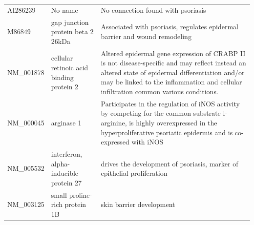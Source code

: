 \documentclass[10pt,a4paper]{report}
\begin{document}
\begin{table}[]
\begin{tabular}{l|p{4.5cm} p{8.5cm}}
			AI286239           &  No name                                                                                                                       &   No connection found with psoriasis                                                                                                                                                                                                                                        \\
			M86849             & gap junction protein beta 2 26kDa                                                                                       & Associated with psoriasis, regulates epidermal barrier and wound remodeling\cite{sun2010association, djalilian2006connexin}                                                                                                                                                               \\
			NM\_001878         & cellular retinoic acid binding protein 2                                                                                & Altered epidermal gene expression of CRABP II is not disease-specific and may reflect instead an altered state of epidermal differentiation and/or may be linked to the inflammation and cellular infiltration common various conditions.\cite{algermissen1996differential} \\
			NM\_000045         & arginase 1                                                                                                              & Participates in the regulation of iNOS activity by competing for the common substrate l-arginine, is highly overexpressed in the hyperproliferative psoriatic epidermis and is co-expressed with iNOS\cite{bruch2003arginase}                                     \\
			NM\_005532         & interferon, alpha-inducible protein 27                                                                                  & drives the development of psoriasis, marker of epithelial proliferation\cite{nestle2005plasmacytoid, suomela2004interferon}                                                                                                                                                                     \\
			NM\_003125         & small proline-rich protein 1B                                                                                           & skin barrier development\cite{bergboer2012genetics}                                                                                                                                                                                                                    \\

\end{tabular}
\end{table}
\end{document}
